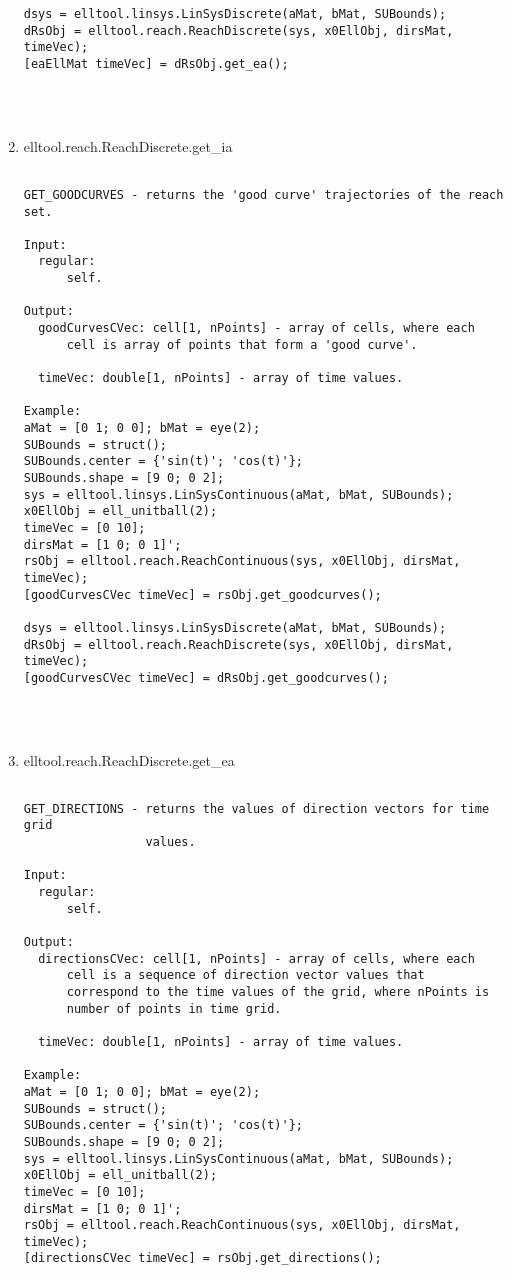 \begin{enumerate}
\begin{lstlisting}
dsys = elltool.linsys.LinSysDiscrete(aMat, bMat, SUBounds);
dRsObj = elltool.reach.ReachDiscrete(sys, x0EllObj, dirsMat, timeVec);
[eaEllMat timeVec] = dRsObj.get_ea();




\end{lstlisting}
\fontfamily{\familydefault}
\selectfont
\item {elltool.reach.ReachDiscrete.get\_ia}
\selectfont
\begin{lstlisting}

GET_GOODCURVES - returns the 'good curve' trajectories of the reach set.

Input:
  regular:
      self.

Output:
  goodCurvesCVec: cell[1, nPoints] - array of cells, where each
      cell is array of points that form a 'good curve'.

  timeVec: double[1, nPoints] - array of time values.

Example:
aMat = [0 1; 0 0]; bMat = eye(2);
SUBounds = struct();
SUBounds.center = {'sin(t)'; 'cos(t)'};
SUBounds.shape = [9 0; 0 2];
sys = elltool.linsys.LinSysContinuous(aMat, bMat, SUBounds);
x0EllObj = ell_unitball(2);
timeVec = [0 10];
dirsMat = [1 0; 0 1]';
rsObj = elltool.reach.ReachContinuous(sys, x0EllObj, dirsMat, timeVec);
[goodCurvesCVec timeVec] = rsObj.get_goodcurves();

dsys = elltool.linsys.LinSysDiscrete(aMat, bMat, SUBounds);
dRsObj = elltool.reach.ReachDiscrete(sys, x0EllObj, dirsMat, timeVec);
[goodCurvesCVec timeVec] = dRsObj.get_goodcurves();




\end{lstlisting}
\fontfamily{\familydefault}
\selectfont
\item {elltool.reach.ReachDiscrete.get\_ea}
\selectfont
\begin{lstlisting}

GET_DIRECTIONS - returns the values of direction vectors for time grid
                 values.

Input:
  regular:
      self.

Output:
  directionsCVec: cell[1, nPoints] - array of cells, where each
      cell is a sequence of direction vector values that
      correspond to the time values of the grid, where nPoints is
      number of points in time grid.

  timeVec: double[1, nPoints] - array of time values.

Example:
aMat = [0 1; 0 0]; bMat = eye(2);
SUBounds = struct();
SUBounds.center = {'sin(t)'; 'cos(t)'};
SUBounds.shape = [9 0; 0 2];
sys = elltool.linsys.LinSysContinuous(aMat, bMat, SUBounds);
x0EllObj = ell_unitball(2);
timeVec = [0 10];
dirsMat = [1 0; 0 1]';
rsObj = elltool.reach.ReachContinuous(sys, x0EllObj, dirsMat, timeVec);
[directionsCVec timeVec] = rsObj.get_directions();


\end{lstlisting}
\end{enumerate}
